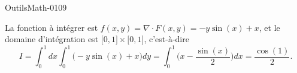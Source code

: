 
\begin{corrige}{OutilsMath-0109}

    La fonction à intégrer est $f(x,y)=\nabla\cdot F(x,y)=-y\sin(x)+x$, et le domaine d'intégration est $\mathopen[ 0 , 1 \mathclose]\times\mathopen[ 0 , 1 \mathclose]$, c'est-à-dire
    \begin{equation}
        I=\int_0^1dx\int_0^1 \big( -y\sin(x)+x \big)dy=\int_0^1\big( x-\frac{ \sin(x) }{2} \big)dx=\frac{ \cos(1) }{2}.
    \end{equation}

\end{corrige}
